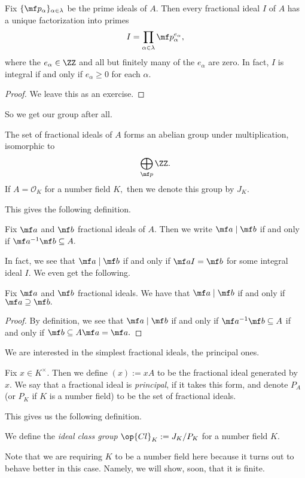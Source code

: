 \begin{thm}
    Fix $\{\mf p_\alpha\}_{\alpha\in\lambda}$ be the prime ideals of $A.$ Then every fractional ideal $I$ of $A$ has a unique factorization into primes
    \[I=\prod_{\alpha\in\lambda}\mf p_\alpha^{e_\alpha},\]
    where the $e_\alpha\in\ZZ$ and all but finitely many of the $e_\alpha$ are zero. In fact, $I$ is integral if and only if $e_\alpha\ge0$ for each $\alpha.$
\end{thm}
\begin{proof}
    We leave this as an exercise.
\end{proof}
So we get our group after all.
\begin{thm}
    The set of fractional ideals of $A$ forms an abelian group under multiplication, isomorphic to
    \[\bigoplus_{\mf p}\ZZ.\]
    If $A=\mathcal O_K$ for a number field $K,$ then we denote this group by $J_K.$
\end{thm}
This gives the following definition.
\begin{defi}
    Fix $\mf a$ and $\mf b$ fractional ideals of $A.$ Then we write $\mf a\mid\mf b$ if and only if $\mf a^{-1}\mf b\subseteq A.$
\end{defi}
In fact, we see that $\mf a\mid\mf b$ if and only if $\mf aI=\mf b$ for some integral ideal $I.$ We even get the following.
\begin{lem}
    Fix $\mf a$ and $\mf b$ fractional ideals. We have that $\mf a\mid\mf b$ if and only if $\mf a\supseteq\mf b.$
\end{lem}
\begin{proof}
    By definition, we see that $\mf a\mid\mf b$ if and only if $\mf a^{-1}\mf b\subseteq A$ if and only if $\mf b\subseteq A\mf a=\mf a.$
\end{proof}
We are interested in the simplest fractional ideals, the principal ones.
\begin{defi}[Principal]
    Fix $x\in K^\times.$ Then we define $(x):=xA$ to be the fractional ideal generated by $x.$ We say that a fractional ideal is \textit{principal}, if it takes this form, and denote $P_A$ (or $P_K$ if $K$ is a number field) to be the set of fractional ideals.
\end{defi}
This gives us the following definition.
\begin{defi}
    We define the \textit{ideal class group} $\op{Cl}_K:=J_K/P_K$ for a number field $K.$
\end{defi}
Note that we are requiring $K$ to be a number field here because it turns out to behave better in this case. Namely, we will show, soon, that it is finite.

